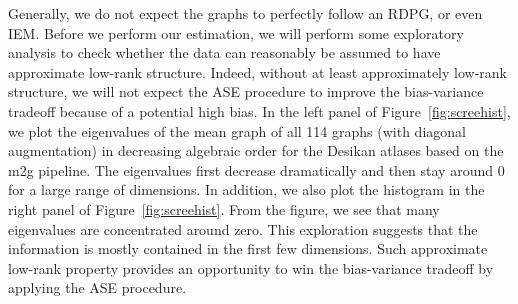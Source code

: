 Generally, we do not expect the graphs to perfectly follow an RDPG, or even IEM. Before we perform our estimation, we will perform some exploratory analysis to check whether the data can reasonably be assumed to have approximate low-rank structure. Indeed, without at least approximately low-rank structure, we will not expect the ASE procedure to improve the bias-variance tradeoff because of a potential high bias. In the left panel of Figure~\ref{fig:screehist}, we plot the eigenvalues of the mean graph of all 114 graphs (with diagonal augmentation) in decreasing algebraic order for the Desikan atlases based on the m2g pipeline. The eigenvalues first decrease dramatically and then stay around 0 for a large range of dimensions. In addition, we also plot the histogram in the right panel of Figure~\ref{fig:screehist}. From the figure, we see that many eigenvalues are concentrated around zero. 
This exploration suggests that the information is mostly contained in the first few dimensions. Such approximate low-rank property provides an opportunity to win the bias-variance tradeoff by applying the ASE procedure.

